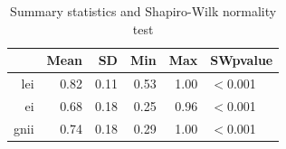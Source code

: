 \begin{table}[ht]
\centering
\begin{tabular}{rrrrrl}
  \toprule
 & Mean & SD & Min & Max & SWpvalue \\
  \midrule
lei & 0.82 & 0.11 & 0.53 & 1.00 & $<$0.001 \\
  ei & 0.68 & 0.18 & 0.25 & 0.96 & $<$0.001 \\
  gnii & 0.74 & 0.18 & 0.29 & 1.00 & $<$0.001 \\
   \bottomrule
\end{tabular}
\caption{Summary statistics and Shapiro-Wilk normality test}
\label{tab:summary_normality}
\end{table}
